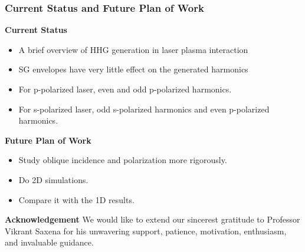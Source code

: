 \documentclass{beamer}
\begin{document}
\begin{frame}
    \frametitle{Current Status and Future Plan of Work}
    \small
    \textbf{Current Status}
    \begin{itemize}
        \item A brief overview of HHG generation in laser plasma interaction
        \item SG envelopes have very little effect on the generated harmonics
        \item For p-polarized laser, even and odd p-polarized harmonics.
        \item For s-polarized laser, odd s-polarized harmonics and even p-polarized harmonics.
    \end{itemize}
    \textbf{Future Plan of Work}
    \begin{itemize}
        \item Study oblique incidence and polarization more rigorously.
        \item Do 2D simulations.
        \item Compare it with the 1D results.
    \end{itemize}
    \textbf{Acknowledgement}
    We would like to extend our sincerest gratitude to Professor Vikrant Saxena for his unwavering support, patience, motivation, enthusiasm, and invaluable guidance.
\end{frame}
\end{document}
